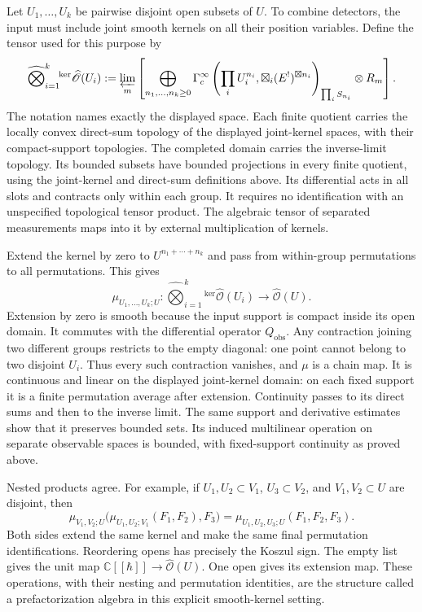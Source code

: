 Let $U_1,\ldots,U_k$ be pairwise disjoint open subsets of $U$.
To combine detectors, the input must include joint smooth kernels on
all their position variables. Define the tensor used for this purpose by
\begin{equation}\label{eq:clo-kernel-tensor}
 \widehat{\bigotimes}_{i=1}^k{}^{\!\mathrm{ker}}
     \widehat{\mathscr O}(U_i)
 :=\varprojlim_m
 \left[
 \bigoplus_{n_1,\ldots,n_k\geq0}
 \Gamma_c^\infty\left(
   \prod_iU_i^{n_i},
   \boxtimes_i(E^!)^{\boxtimes n_i}\right)_{\prod_iS_{n_i}}
 \otimes R_m\right].
\end{equation}
The notation names exactly the displayed space.
Each finite quotient carries the locally convex direct-sum topology of
the displayed joint-kernel spaces, with their compact-support topologies.
The completed domain carries the inverse-limit topology.
Its bounded subsets have bounded projections in every finite quotient,
using the joint-kernel and direct-sum definitions above.
Its differential acts in all slots and contracts only within each group.
It requires no identification with an unspecified topological tensor
product. The algebraic tensor of separated measurements maps into it by
external multiplication of kernels.

Extend the kernel by zero to $U^{n_1+\cdots+n_k}$ and pass from
within-group permutations to all permutations. This gives
\begin{equation}\label{eq:clo-factorization-product}
 \mu_{U_1,\ldots,U_k;U}:
 \widehat{\bigotimes}_{i=1}^k{}^{\!\mathrm{ker}}
 \widehat{\mathscr O}(U_i)\longrightarrow\widehat{\mathscr O}(U).
\end{equation}
Extension by zero is smooth because the input support is compact inside
its open domain. It commutes with the differential operator
$Q_{\mathrm{obs}}$.
Any contraction joining two different groups restricts to the empty
diagonal: one point cannot belong to two disjoint $U_i$.
Thus every such contraction vanishes, and $\mu$ is a chain map.
It is continuous and linear on the displayed joint-kernel domain:
on each fixed support it is a finite permutation average after extension.
Continuity passes to its direct sums and then to the inverse limit.
The same support and derivative estimates show that it preserves bounded
sets. Its induced multilinear operation on separate observable spaces
is bounded, with fixed-support continuity as proved above.

Nested products agree. For example, if $U_1,U_2\subset V_1$,
$U_3\subset V_2$, and $V_1,V_2\subset U$ are disjoint, then
\[
 \mu_{V_1,V_2;U}\bigl(\mu_{U_1,U_2;V_1}(F_1,F_2),F_3\bigr)
 =\mu_{U_1,U_2,U_3;U}(F_1,F_2,F_3).
\]
Both sides extend the same kernel and make the same final permutation
identifications. Reordering opens has precisely the Koszul sign.
The empty list gives the unit map $\mathbb C[[\hbar]]\to
\widehat{\mathscr O}(U)$.
One open gives its extension map.
These operations, with their nesting and permutation identities, are
the structure called a prefactorization algebra in this explicit
smooth-kernel setting.

